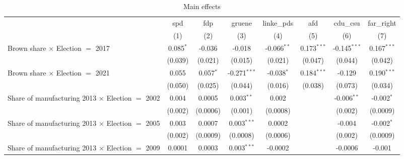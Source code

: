 \begin{table}[htbp]
   \caption{Main effects}
   \centering
   \begin{tabular}{lccccccc}
      \tabularnewline \midrule \midrule
                                                              & spd            & fdp            & gruene                 & linke\_pds     & afd            & cdu\_csu       & far\_right\\   
                                                              & (1)            & (2)            & (3)                    & (4)            & (5)            & (6)            & (7)\\  
      Brown share $\times$ Election $=$ 2017                  & 0.085$^{*}$    & -0.036         & -0.018                 & -0.066$^{**}$  & 0.173$^{***}$  & -0.145$^{***}$ & 0.167$^{***}$\\   
                                                              & (0.039)        & (0.021)        & (0.015)                & (0.021)        & (0.047)        & (0.044)        & (0.042)\\   
      Brown share $\times$ Election $=$ 2021                  & 0.055          & 0.057$^{*}$    & -0.271$^{***}$         & -0.038$^{*}$   & 0.184$^{***}$  & -0.129         & 0.190$^{***}$\\   
                                                              & (0.050)        & (0.025)        & (0.044)                & (0.016)        & (0.038)        & (0.073)        & (0.034)\\   
      Share of manufacturing 2013 $\times$ Election $=$ 2002  & 0.004          & 0.0005         & 0.003$^{**}$           & 0.002          &                & -0.006$^{**}$  & -0.002$^{*}$\\   
                                                              & (0.002)        & (0.0006)       & (0.001)                & (0.0008)       &                & (0.002)        & (0.0009)\\   
      Share of manufacturing 2013 $\times$ Election $=$ 2005  & 0.003          & 0.0007         & 0.003$^{***}$          & 0.0002         &                & -0.004         & -0.002$^{*}$\\   
                                                              & (0.002)        & (0.0009)       & (0.0008)               & (0.0006)       &                & (0.002)        & (0.0009)\\   
      Share of manufacturing 2013 $\times$ Election $=$ 2009  & 0.0001         & 0.0003         & 0.003$^{***}$          & -0.0002        &                & -0.0006        & -0.001\\   

\end{tabular}
\end{table}
